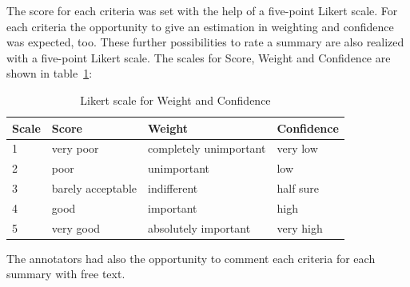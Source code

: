 The score for each criteria was set with the help of a five-point Likert scale.
For each criteria the opportunity to give an estimation in weighting and confidence was expected, too. These further possibilities to rate a summary are also realized with a five-point Likert scale.
The scales for Score, Weight and Confidence are shown in table~\ref{tab:evalikert}:

\begin{table}[H]
	\begin{tabularx}{\textwidth}{l|XXX} \toprule
		Scale & Score & Weight & Confidence \\ \midrule
		1 & very poor & completely unimportant & very low \\
		2 & poor & unimportant & low \\
		3 & barely acceptable & indifferent & half sure \\
		4 & good & important & high \\
		5 & very good & absolutely important & very high \\ \bottomrule    
	\end{tabularx}
	\caption{Likert scale for Weight and Confidence}
	\label{tab:evalikert}
\end{table}

The annotators had also the opportunity to comment each criteria for each summary with free text.


